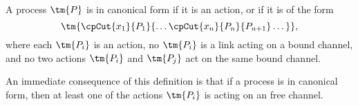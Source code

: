 \begin{definition}\label{def:cp-canonical-forms}
  A process $\tm{P}$ is in canonical form if it is an action, or if it is of the
  form
  \[
    \tm{\cpCut{x_1}{P_1}{\dots \cpCut{x_n}{P_n}{P_{n+1}}\dots}},
  \]
  where each $\tm{P_i}$ is an action, no $\tm{P_i}$ is a link acting on a bound
  channel, and no two actions $\tm{P_i}$ and $\tm{P_j}$ act on the same bound
  channel.

  An immediate consequence of this definition is that if a process is in
  canonical form, then at least one of the actions $\tm{P_i}$ is acting on an
  free channel.
\end{definition}

